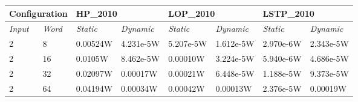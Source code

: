 \begin{table}[b!]
\centering

\label{my-label}
\begin{tabular}{@{}llllllll@{}}
\toprule
\multicolumn{2}{l}{\textbf{Configuration}} & \multicolumn{2}{l}{\textbf{HP\_2010}} & \multicolumn{2}{l}{\textbf{LOP\_2010}} & \multicolumn{2}{l}{\textbf{LSTP\_2010}} \\ \midrule
\textit{Input}         & \textit{Word}        & \textit{Static}   & \textit{Dynamic}  & \textit{Static}   & \textit{Dynamic}   & \textit{Static}    & \textit{Dynamic}   \\
2                      & 8                 & 0.00524W           & 4.231e-5W          & 5.207e-5W          & 1.612e-5W           & 2.970e-6W          & 2.343e-5W           \\
2                      & 16                & 0.0105W            & 8.462e-5W          & 0.00010W           & 3.224e-5W           & 5.940e-6W           & 4.686e-5W           \\
2                      & 32                & 0.02097W           & 0.00017W           & 0.00021W           & 6.448e-5W           & 1.188e-5W           & 9.373e-5W           \\
2                      & 64                & 0.04194W          & 0.00034W           & 0.00042W           & 0.00013W            & 2.376e-5W           & 0.00019W           
\end{tabular}
\end{table}

